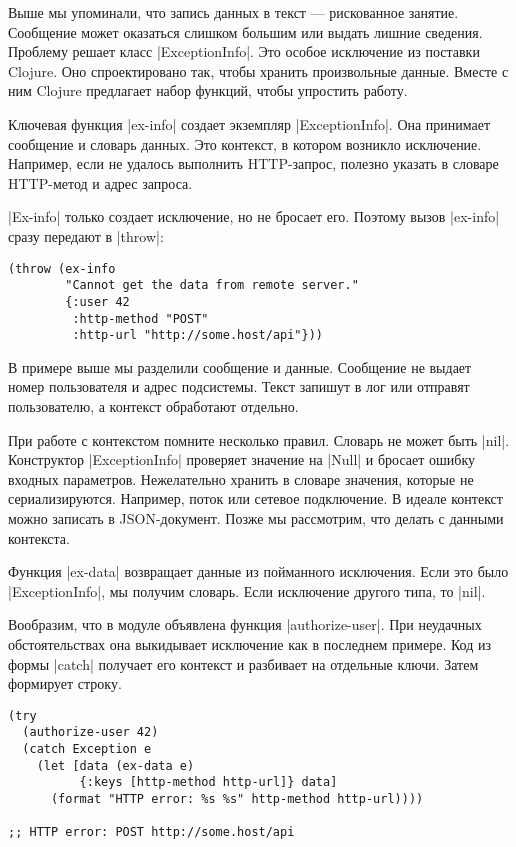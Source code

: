 Выше мы упоминали, что запись данных в текст — рискованное занятие. Сообщение
может оказаться слишком большим или выдать лишние сведения. Проблему решает
класс \spverb|ExceptionInfo|. Это особое исключение из поставки Clojure. Оно
спроектировано так, чтобы хранить произвольные данные. Вместе с ним Clojure
предлагает набор функций, чтобы упростить работу.

Ключевая функция \spverb|ex-info| создает экземпляр \spverb|ExceptionInfo|. Она принимает
сообщение и словарь данных. Это контекст, в котором возникло
исключение. Например, если не удалось выполнить HTTP-запрос, полезно указать в
словаре HTTP-метод и адрес запроса.

\spverb|Ex-info| только создает исключение, но не бросает его. Поэтому вызов \spverb|ex-info|
сразу передают в \spverb|throw|:

\begin{verbatim}
(throw (ex-info
        "Cannot get the data from remote server."
        {:user 42
         :http-method "POST"
         :http-url "http://some.host/api"}))
\end{verbatim}

В примере выше мы разделили сообщение и данные. Сообщение не выдает номер
пользователя и адрес подсистемы. Текст запишут в лог или отправят пользователю,
а контекст обработают отдельно.

При работе с контекстом помните несколько правил. Словарь не может быть
\spverb|nil|. Конструктор \spverb|ExceptionInfo| проверяет значение на \spverb|Null| и бросает ошибку
входных параметров. Нежелательно хранить в словаре значения, которые не
сериализируются. Например, поток или сетевое подключение. В идеале контекст
можно записать в JSON-документ. Позже мы рассмотрим, что делать с данными
контекста.

Функция \spverb|ex-data| возвращает данные из пойманного исключения. Если это было
\spverb|ExceptionInfo|, мы получим словарь. Если исключение другого типа, то \spverb|nil|.

Вообразим, что в модуле объявлена функция \spverb|authorize-user|. При неудачных
обстоятельствах она выкидывает исключение как в последнем примере. Код из формы
\spverb|catch| получает его контекст и разбивает на отдельные ключи. Затем формирует
строку.

\begin{verbatim}
(try
  (authorize-user 42)
  (catch Exception e
    (let [data (ex-data e)
          {:keys [http-method http-url]} data]
      (format "HTTP error: %s %s" http-method http-url))))

;; HTTP error: POST http://some.host/api
\end{verbatim}

